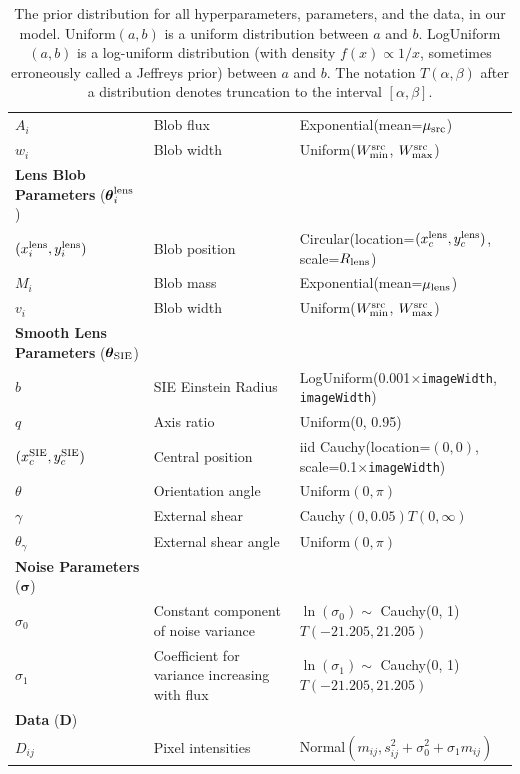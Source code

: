 \documentclass[useAMS,usenatbib]{mn2e}
\begin{document}
\begin{table}
\begin{tabular}{|l|l|l|}
$A_i$  & Blob flux & Exponential(mean=$\mu_{\rm src}$)\\
$w_i$  & Blob width & Uniform($W_{\rm min}^{\rm src}$, $W_{\rm max}^{\rm src}$)\\
\hline
{\bf Lens Blob Parameters} ($\boldsymbol{\theta}_i^{\rm lens}$)\\
\hline
$(x_i^{\rm lens}, y_i^{\rm lens})$ & Blob position & Circular(location=$(x_c^{\rm lens}, y_c^{\rm lens})$, scale=$R_{\rm lens}$) \\
$M_i$  & Blob mass & Exponential(mean=$\mu_{\rm lens}$)\\
$v_i$  & Blob width & Uniform($W_{\rm min}^{\rm src}$, $W_{\rm max}^{\rm src}$)\\
\hline
{\bf Smooth Lens Parameters} ($\boldsymbol{\theta}_{\rm SIE}$)\\
\hline
$b$ & SIE Einstein Radius & LogUniform(0.001$\times${\tt imageWidth}, {\tt imageWidth})\\
$q$ & Axis ratio & Uniform(0, 0.95)\\
$(x_c^{\rm SIE}, y_c^{\rm SIE})$ & Central position & iid Cauchy(location=$(0,0)$, scale=0.1$\times${\tt imageWidth})\\
$\theta$ & Orientation angle & Uniform$(0, \pi)$\\
$\gamma$ & External shear & Cauchy$(0, 0.05)T(0, \infty)$\\
$\theta_\gamma$ & External shear angle & Uniform$(0, \pi)$\\
\hline
{\bf Noise Parameters} ($\boldsymbol{\sigma}$)\\
\hline
$\sigma_0$ & Constant component of noise variance & $\ln(\sigma_0) \sim$ Cauchy(0, 1)$T(-21.205, 21.205)$\\
$\sigma_1$ & Coefficient for variance increasing with flux &
$\ln(\sigma_1) \sim$ Cauchy(0, 1)$T(-21.205, 21.205)$\\
\hline
{\bf Data} ($\boldsymbol{D}$)\\
\hline
$D_{ij}$ & Pixel intensities & Normal$(m_{ij}, s_{ij}^2 + \sigma_0^2 + \sigma_1m_{ij})$
\end{tabular}
\caption{The prior distribution for all hyperparameters, parameters, and the
data, in our model. Uniform$(a, b)$ is a uniform
distribution between $a$ and $b$. LogUniform$(a, b)$ is a log-uniform
distribution (with density $f(x) \propto 1/x$, sometimes erroneously called
a Jeffreys prior) between $a$ and $b$. The notation $T(\alpha, \beta)$ after
a distribution denotes truncation to the interval $[\alpha, \beta]$.
\label{tab:priors}}
\end{table}
\end{document}

